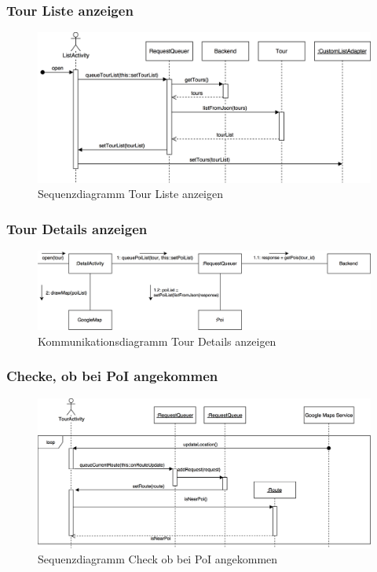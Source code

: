 \documentclass[a4paper,10pt,xetex]{article}
\begin{document}
\subsubsection{Tour Liste anzeigen}
\begin{figure}
  \includegraphics{Sequenzdiagramm_ListActivity}
  \caption{Sequenzdiagramm Tour Liste anzeigen}
\end{figure}

\subsubsection{Tour Details anzeigen}
\begin{figure}
  \includegraphics{Kommunikationsdiagramm_DetailActivity}
  \caption{Kommunikationsdiagramm Tour Details anzeigen}
\end{figure}

\subsubsection{Checke, ob bei PoI angekommen}
\begin{figure}
  \includegraphics{Sequenzdiagramm_IsNearPoi}
  \caption{Sequenzdiagramm Check ob bei PoI angekommen}
\end{figure}
\end{document}
